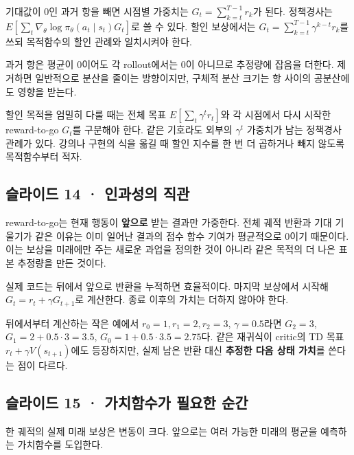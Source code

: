 \documentclass[11pt,a4paper]{article}
\begin{document}
기대값이 0인 과거 항을 빼면 시점별 가중치는 $G_t=\sum_{k=t}^{T-1}r_k$가 된다. 정책경사는 $E[\sum_t\nabla_\theta\log\pi_\theta(a_t\mid s_t)G_t]$로 쓸 수 있다. 할인 보상에서는 $G_t=\sum_{k=t}^{T-1}\gamma^{k-t}r_k$를 쓰되 목적함수의 할인 관례와 일치시켜야 한다.\par

과거 항은 평균이 0이어도 각 rollout에서는 0이 아니므로 추정량에 잡음을 더한다. 제거하면 일반적으로 분산을 줄이는 방향이지만, 구체적 분산 크기는 항 사이의 공분산에도 영향을 받는다.\par

할인 목적을 엄밀히 다룰 때는 전체 목표 $E[\sum_t\gamma^t r_t]$와 각 시점에서 다시 시작한 reward-to-go $G_t$를 구분해야 한다. 같은 기호라도 외부의 $\gamma^t$ 가중치가 남는 정책경사 관례가 있다. 강의나 구현의 식을 옮길 때 할인 지수를 한 번 더 곱하거나 빼지 않도록 목적함수부터 적자.\par

\subsection{슬라이드 14 · 인과성의 직관}

reward-to-go는 현재 행동이 \textbf{앞으로} 받는 결과만 가중한다. 전체 궤적 반환과 기대 기울기가 같은 이유는 이미 일어난 결과의 점수 함수 기여가 평균적으로 0이기 때문이다. 이는 보상을 미래에만 주는 새로운 과업을 정의한 것이 아니라 같은 목적의 더 나은 표본 추정량을 만든 것이다.\par

실제 코드는 뒤에서 앞으로 반환을 누적하면 효율적이다. 마지막 보상에서 시작해 $G_t=r_t+\gamma G_{t+1}$로 계산한다. 종료 이후의 가치는 더하지 않아야 한다.\par

뒤에서부터 계산하는 작은 예에서 $r_0=1,r_1=2,r_2=3$, $\gamma=0.5$라면 $G_2=3$, $G_1=2+0.5\cdot3=3.5$, $G_0=1+0.5\cdot3.5=2.75$다. 같은 재귀식이 critic의 TD 목표 $r_t+\gamma V(s_{t+1})$에도 등장하지만, 실제 남은 반환 대신 \textbf{추정한 다음 상태 가치}를 쓴다는 점이 다르다.\par

\subsection{슬라이드 15 · 가치함수가 필요한 순간}

한 궤적의 실제 미래 보상은 변동이 크다. 앞으로는 여러 가능한 미래의 평균을 예측하는 가치함수를 도입한다.\par
\end{document}
